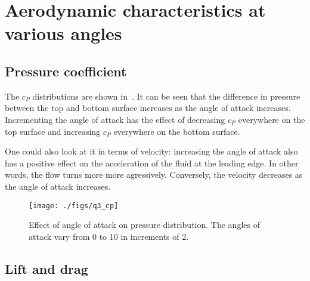 \section{Aerodynamic characteristics at various angles}
\subsection{Pressure coefficient}
The $c_P$ distributions are shown in~. It can be seen that the difference
in pressure between the top and bottom surface increases as the angle of attack increases. Incrementing
the angle of attack has the effect of decreasing $c_P$ everywhere on the top surface and increasing
$c_P$ everywhere on the bottom surface.

One could also look at it in terms of velocity: increasing the angle of attack also has a positive
effect on the acceleration of the fluid at the leading edge. In other words, the flow turns more
more agressively. Conversely, the velocity decreases as the angle of attack increases.

\begin{figure}
    \centering
    \texttt{[image: ./figs/q3\_cp]}
    \caption{Effect of angle of attack on pressure distribution. The angles of attack vary from 0 to
        10 in increments of 2.}
    \label{fig:q3_cp}
\end{figure}

\subsection{Lift and drag}
